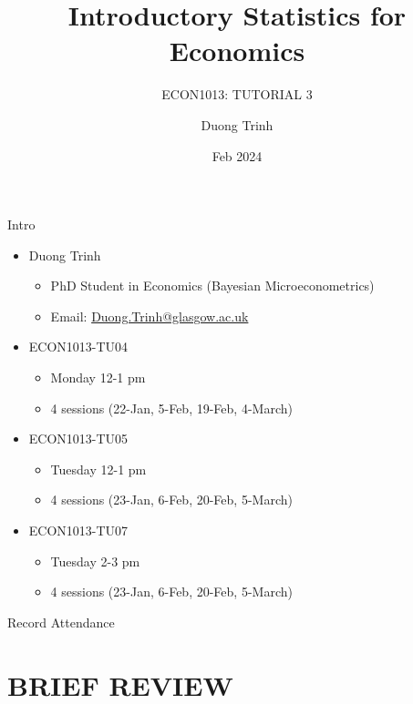 \documentclass[
  11pt,
  ignorenonframetext,
]{beamer}
\title{Introductory Statistics for Economics}
\subtitle{ECON1013: TUTORIAL 3}
\author{Duong Trinh}
\date{Feb 2024}
\institute{University of Glasgow}
\providecommand{\tightlist}{%
  \setlength{\itemsep}{0pt}\setlength{\parskip}{0pt}}
\begin{document}
\frame{\titlepage}

\begin{frame}{Intro}
\protect\hypertarget{intro}{}
\begin{itemize}
\tightlist
\item
  Duong Trinh

  \begin{itemize}
  \tightlist
  \item
    PhD Student in Economics (Bayesian Microeconometrics)
  \item
    Email: \underline{Duong.Trinh@glasgow.ac.uk}
  \end{itemize}
\end{itemize}

\vspace{3mm}

\begin{itemize}
\tightlist
\item
  ECON1013-TU04

  \begin{itemize}
  \tightlist
  \item
    Monday 12-1 pm
  \item
    4 sessions (22-Jan, 5-Feb, 19-Feb, 4-March)
  \end{itemize}
\item
  ECON1013-TU05

  \begin{itemize}
  \tightlist
  \item
    Tuesday 12-1 pm
  \item
    4 sessions (23-Jan, 6-Feb, 20-Feb, 5-March)
  \end{itemize}
\item
  ECON1013-TU07

  \begin{itemize}
  \tightlist
  \item
    Tuesday 2-3 pm
  \item
    4 sessions (23-Jan, 6-Feb, 20-Feb, 5-March)
  \end{itemize}
\end{itemize}
\end{frame}

\begin{frame}{Record Attendance}
\protect\hypertarget{record-attendance}{}
\end{frame}

\hypertarget{brief-review}{%
\section{BRIEF REVIEW}\label{brief-review}}
\end{document}
